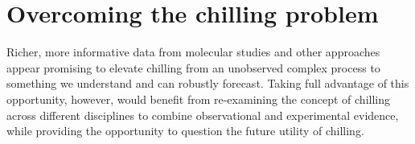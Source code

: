 \documentclass[11pt]{article}
\begin{document}


\section*{Overcoming the chilling problem}
Richer, more informative data from molecular studies and other approaches \citep{fouche2023transport,walde2024stable} appear promising to elevate chilling from an unobserved complex process to something we understand and can robustly forecast. Taking full advantage of this opportunity, however, would benefit from re-examining the concept of chilling across different disciplines to combine observational and experimental evidence, while providing the opportunity to question the future utility of chilling.

\end{document}
